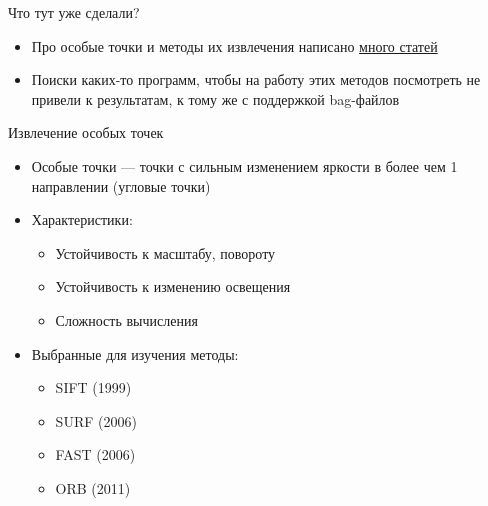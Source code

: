 \begin{frame}{Что тут уже сделали?}

\begin{itemize}
	\item Про особые точки и методы их извлечения написано \underline{много статей}
	\item Поиски каких-то программ, чтобы на работу этих методов посмотреть не привели к результатам,
	к тому же с поддержкой bag-файлов
\end{itemize}
\end{frame}


\begin{frame}{Извлечение особых точек}
\begin{itemize}
	\item Особые точки --- точки с сильным изменением яркости в более чем 1 направлении (угловые точки)
	\item Характеристики:
	\begin{itemize}
		\item Устойчивость к масштабу, повороту
		\item Устойчивость к изменению освещения
		\item Сложность вычисления
	\end{itemize}
	\item Выбранные для изучения методы:
	\begin{itemize}
		\item SIFT (1999)
		\item SURF (2006)
		\item FAST (2006)
		\item ORB (2011)
	\end{itemize}
\end{itemize}
\end{frame}

